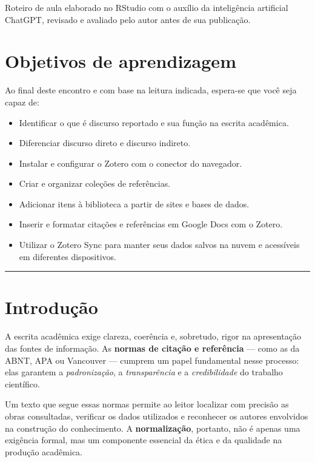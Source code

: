 \documentclass[
  letterpaper,
  DIV=11,
  numbers=noendperiod]{scrreprt}
\begin{document}
Roteiro de aula elaborado no RStudio com o auxílio da inteligência
artificial ChatGPT, revisado e avaliado pelo autor antes de sua
publicação.

\section{Objetivos de aprendizagem}\label{objetivos-de-aprendizagem-3}

Ao final deste encontro e com base na leitura indicada, espera-se que
você seja capaz de:

\begin{itemize}
\item
  Identificar o que é discurso reportado e sua função na escrita
  acadêmica.
\item
  Diferenciar discurso direto e discurso indireto.
\item
  Instalar e configurar o Zotero com o conector do navegador.
\item
  Criar e organizar coleções de referências.
\item
  Adicionar itens à biblioteca a partir de sites e bases de dados.
\item
  Inserir e formatar citações e referências em Google Docs com o Zotero.
\item
  Utilizar o Zotero Sync para manter seus dados salvos na nuvem e
  acessíveis em diferentes dispositivos.
\end{itemize}

\begin{center}\rule{0.5\linewidth}{0.5pt}\end{center}

\section{Introdução}\label{introduuxe7uxe3o-2}

A escrita acadêmica exige clareza, coerência e, sobretudo, rigor na
apresentação das fontes de informação. As \textbf{normas de citação e
referência} --- como as da ABNT, APA ou Vancouver --- cumprem um papel
fundamental nesse processo: elas garantem a \emph{padronização}, a
\emph{transparência} e a \emph{credibilidade} do trabalho científico.

Um texto que segue essas normas permite ao leitor localizar com precisão
as obras consultadas, verificar os dados utilizados e reconhecer os
autores envolvidos na construção do conhecimento. A
\textbf{normalização}, portanto, não é apenas uma exigência formal, mas
um componente essencial da ética e da qualidade na produção acadêmica.
\end{document}
